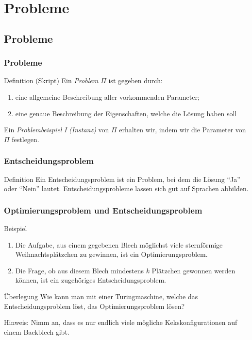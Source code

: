 \section{Probleme}
\subsection{Probleme}
\begin{frame}
 \frametitle{Probleme}
 \begin{block}{Definition (Skript)}
 Ein \emph{Problem $\Pi$} ist gegeben durch:
 \begin{enumerate}
  \item eine allgemeine Beschreibung aller vorkommenden Parameter;
  \item eine genaue Beschreibung der Eigenschaften, welche die Lösung haben soll
 \end{enumerate}
 \end{block}
 Ein \emph{Problembeispiel} \textit{I} \emph{(Instanz)} von $\Pi$ erhalten wir, indem wir die Parameter von $\Pi$ festlegen.
\end{frame}

\begin{frame}
 \frametitle{Entscheidungsproblem}
 \begin{block}{Definition}
  Ein Entscheidungsproblem ist ein Problem, bei dem die Lösung "`Ja"' oder "`Nein"' lautet. 
  Entscheidungsprobleme lassen sich gut auf Sprachen abbilden.
 \end{block}
\end{frame}

\begin{frame}
 \frametitle{Optimierungsproblem und Entscheidungsproblem}
 \begin{block}{Beispiel}
  \begin{enumerate}
   \item Die Aufgabe, aus einem gegebenen Blech möglichst viele sternförmige Weihnachtsplätzchen zu gewinnen, ist ein Optimierungsproblem.
   \item Die Frage, ob aus diesem Blech mindestens $k$ Plätzchen gewonnen werden können, ist ein zugehöriges Entscheidungsproblem.
  \end{enumerate}
 \end{block}
 \begin{block}{Überlegung}
  Wie kann man mit einer Turingmaschine, welche das Entscheidungsproblem löst, das Optimierungsproblem lösen?
 \end{block}
 Hinweis: Nimm an, dass es nur endlich viele mögliche Kekskonfigurationen auf einem Backblech gibt.
\end{frame}

